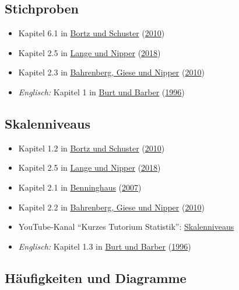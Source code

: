 \documentclass[
  11pt,
  ngerman,
  a4paper,
]{report}
\providecommand{\tightlist}{%
  \setlength{\itemsep}{0pt}\setlength{\parskip}{0pt}}
\begin{document}
\hypertarget{stichproben}{%
\subsection{Stichproben}\label{stichproben}}

\begin{itemize}
\tightlist
\item
  Kapitel 6.1 in \protect\hyperlink{ref-bortz}{Bortz und Schuster} (\protect\hyperlink{ref-bortz}{2010})
\item
  Kapitel 2.5 in \protect\hyperlink{ref-delange}{Lange und Nipper} (\protect\hyperlink{ref-delange}{2018})
\item
  Kapitel 2.3 in \protect\hyperlink{ref-bahrenberg}{Bahrenberg, Giese und Nipper} (\protect\hyperlink{ref-bahrenberg}{2010})
\item
  \emph{Englisch:} Kapitel 1 in \protect\hyperlink{ref-burt}{Burt und Barber} (\protect\hyperlink{ref-burt}{1996})
\end{itemize}

\hypertarget{skalenniveaus-1}{%
\subsection{Skalenniveaus}\label{skalenniveaus-1}}

\begin{itemize}
\tightlist
\item
  Kapitel 1.2 in \protect\hyperlink{ref-bortz}{Bortz und Schuster} (\protect\hyperlink{ref-bortz}{2010})
\item
  Kapitel 2.5 in \protect\hyperlink{ref-delange}{Lange und Nipper} (\protect\hyperlink{ref-delange}{2018})
\item
  Kapitel 2.1 in \protect\hyperlink{ref-benninghaus}{Benninghaus} (\protect\hyperlink{ref-benninghaus}{2007})
\item
  Kapitel 2.2 in \protect\hyperlink{ref-bahrenberg}{Bahrenberg, Giese und Nipper} (\protect\hyperlink{ref-bahrenberg}{2010})
\item
  YouTube-Kanal \enquote{Kurzes Tutorium Statistik}: \href{https://www.youtube.com/watch?v=TV4tTtW4UBU}{Skalenniveaus}
\item
  \emph{Englisch:} Kapitel 1.3 in \protect\hyperlink{ref-burt}{Burt und Barber} (\protect\hyperlink{ref-burt}{1996})
\end{itemize}

\hypertarget{huxe4ufigkeiten-und-diagramme}{%
\subsection{Häufigkeiten und Diagramme}\label{huxe4ufigkeiten-und-diagramme}}
\end{document}
